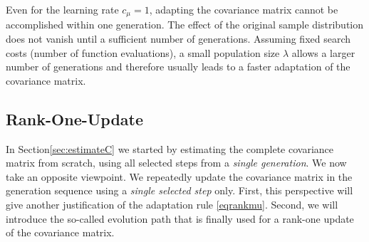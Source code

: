 \documentclass{article} %
\newcommand{\lam}{\ensuremath{\lambda}}
\newcommand{\cmu}{\ensuremath{c_\mu}}
\newcommand{\nref}[1]{\nolinebreak[4]\hspace{0.2845em plus0.05em minus0.17em}\nolinebreak[4]\ref{#1}}
\begin{document}
\label{text:learninganditerations}
\newcommand{\reflearninganditerations}{end of
  Section\nref{text:learninganditerations}} Even for the learning rate
$\cmu=1$, adapting the covariance matrix cannot be accomplished
within one generation. The effect of the original sample distribution
does not vanish until a sufficient number of generations.  Assuming fixed
search costs (number of function evaluations), a small population size
$\lam$ allows a larger number of generations and therefore usually
leads to a faster adaptation of the covariance matrix.

\newcommand{\new}[1]{}
\renewcommand{\new}[1]{#1}

\subsection{Rank-One-Update\label{sec:rankone}}

 In Section\nref{sec:estimateC} we started by estimating the complete covariance
 matrix from scratch, using all selected steps from a \emph{single
 generation}. We now take an opposite viewpoint. We
 repeatedly update the covariance matrix in the generation
 sequence using a \emph{single selected step} only. First, this
 perspective will give another justification of the adaptation rule
 \eqref{eqrankmu}. Second, we will introduce the so-called evolution
 path that is finally used for a rank-one update of the covariance matrix.
\end{document}
